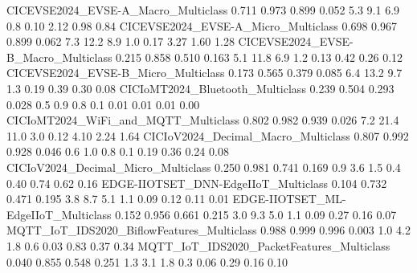 CICEVSE2024_EVSE-A_Macro_Multiclass                                      0.711      0.973       0.899      0.052          5.3          9.1           6.9          0.8         0.10         2.12          0.98         0.84
CICEVSE2024_EVSE-A_Micro_Multiclass                                      0.698      0.967       0.899      0.062          7.3         12.2           8.9          1.0         0.17         3.27          1.60         1.28
CICEVSE2024_EVSE-B_Macro_Multiclass                                      0.215      0.858       0.510      0.163          5.1         11.8           6.9          1.2         0.13         0.42          0.26         0.12
CICEVSE2024_EVSE-B_Micro_Multiclass                                      0.173      0.565       0.379      0.085          6.4         13.2           9.7          1.3         0.19         0.39          0.30         0.08
CICIoMT2024_Bluetooth_Multiclass                                         0.239      0.504       0.293      0.028          0.5          0.9           0.8          0.1         0.01         0.01          0.01         0.00
CICIoMT2024_WiFi_and_MQTT_Multiclass                                     0.802      0.982       0.939      0.026          7.2         21.4          11.0          3.0         0.12         4.10          2.24         1.64
CICIoV2024_Decimal_Macro_Multiclass                                      0.807      0.992       0.928      0.046          0.6          1.0           0.8          0.1         0.19         0.36          0.24         0.08
CICIoV2024_Decimal_Micro_Multiclass                                      0.250      0.981       0.741      0.169          0.9          3.6           1.5          0.4         0.40         0.74          0.62         0.16
EDGE-IIOTSET_DNN-EdgeIIoT_Multiclass                                     0.104      0.732       0.471      0.195          3.8          8.7           5.1          1.1         0.09         0.12          0.11         0.01
EDGE-IIOTSET_ML-EdgeIIoT_Multiclass                                      0.152      0.956       0.661      0.215          3.0          9.3           5.0          1.1         0.09         0.27          0.16         0.07
MQTT_IoT_IDS2020_BiflowFeatures_Multiclass                               0.988      0.999       0.996      0.003          1.0          4.2           1.8          0.6         0.03         0.83          0.37         0.34
MQTT_IoT_IDS2020_PacketFeatures_Multiclass                               0.040      0.855       0.548      0.251          1.3          3.1           1.8          0.3         0.06         0.29          0.16         0.10
